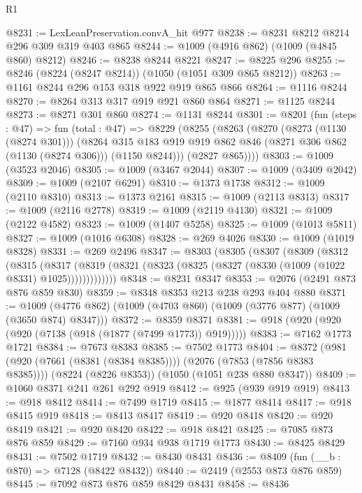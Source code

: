 \begin{lexlean}{R1}
\begin{coremodule}
@8231 := LexLeanPreservation.convA_hit @977
@8238 := @8231 @8212 @8214 @296 @309 @319 @403 @865
@8244 := @1009 (@4916 @862) (@1009 (@4845 @860) @8212)
@8246 := @8238 @8244 @8221
@8247 := @8225 @296
@8255 := @8246 (@8224 (@8247 @8214)) (@1050 (@1051 @309 @865 @8212))
@8263 := @1161 @8244 @296 @153 @318 @922 @919 @865 @866
@8264 := @1116 @8244
@8270 := @8264 @313 @317 @919 @921 @860 @864
@8271 := @1125 @8244
@8273 := @8271 @301 @860
@8274 := @1131 @8244
@8301 := @8201
    (fun (steps : @47) =>
    fun (total : @47) =>
    @8229
      (@8255
        (@8263
          (@8270
            (@8273 (@1130 (@8274 @301)))
            (@8264
              @315
              @183
              @919
              @919
              @862
              @846
              (@8271 @306 @862 (@1130 (@8274 @306)))
              (@1150 @8244)))
          (@2827 @865))))
@8303 := @1009 (@3523 @2046)
@8305 := @1009 (@3467 @2044)
@8307 := @1009 (@3409 @2042)
@8309 := @1009 (@2107 @6291)
@8310 := @1373 @1738
@8312 := @1009 (@2110 @8310)
@8313 := @1373 @2161
@8315 := @1009 (@2113 @8313)
@8317 := @1009 (@2116 @2778)
@8319 := @1009 (@2119 @4130)
@8321 := @1009 (@2122 @4582)
@8323 := @1009 (@1407 @5258)
@8325 := @1009 (@1013 @5811)
@8327 := @1009 (@1016 @6308)
@8328 := @269 @4026
@8330 := @1009 (@1019 @8328)
@8331 := @269 @2496
@8347 := @8303
    (@8305
      (@8307
        (@8309
          (@8312
            (@8315
              (@8317
                (@8319 (@8321 (@8323 (@8325 (@8327 (@8330 (@1009 (@1022 @8331) @1025)))))))))))))
@8348 := @8231 @8347
@8353 := @2076 (@2491 @873 @876 @859 @830)
@8359 := @8348 @8353 @213 @238 @293 @404 @880
@8371 := @1009 (@4776 @862) (@1009 (@4703 @860) (@1009 (@3776 @877) (@1009 (@3650 @874) @8347)))
@8372 := @8359 @8371
@8381 := @918 (@920 (@920 (@920 (@7138 (@918 (@1877 (@7499 @1773)) @919)))))
@8383 := @7162 @1773 @1721
@8384 := @7673 @8383
@8385 := @7502 @1773
@8404 := @8372
    (@981 (@920 (@7661 (@8381 (@8384 @8385)))) (@2076 (@7853 (@7856 @8383 @8385))))
    (@8224 (@8226 @8353))
    (@1050 (@1051 @238 @880 @8347))
@8409 := @1060 @8371 @241 @261 @292 @919
@8412 := @925 (@939 @919 @919)
@8413 := @918 @8412
@8414 := @7499 @1719
@8415 := @1877 @8414
@8417 := @918 @8415 @919
@8418 := @8413 @8417
@8419 := @920 @8418
@8420 := @920 @8419
@8421 := @920 @8420
@8422 := @918 @8421
@8425 := @7085 @873 @876 @859
@8429 := @7160 @934 @938 @1719 @1773
@8430 := @8425 @8429
@8431 := @7502 @1719
@8432 := @8430 @8431
@8436 := @8409 (fun (__b : @870) => @7128 (@8422 @8432))
@8440 := @2419 (@2553 @873 @876 @859)
@8445 := @7092 @873 @876 @859 @8429 @8431
@8458 := @8436

\end{coremodule}
\end{lexlean}

